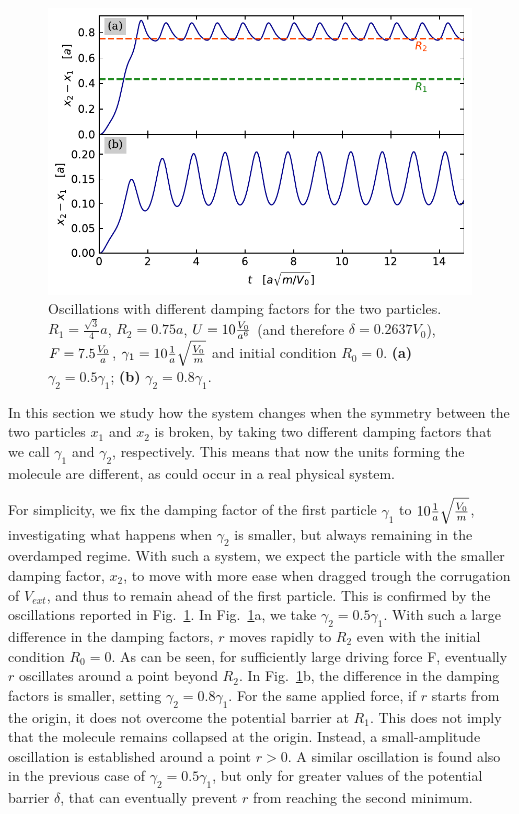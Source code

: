 \begin{figure}
\begin{center}
    \centering
    \includegraphics[width=1\linewidth]{Images/different.pdf}
    \caption{Oscillations with different damping factors for the two particles. $R_1 = \frac{\sqrt{3}}{4} a$, $R_2 = 0.75 a$, $ U = 10 \frac{V_0}{a^6}$ (and therefore $\delta = 0.2637 V_0$), $F = 7.5 \frac{V_0}{a}$, $\gamma_1 = 10 \frac{1}{a}\sqrt{\frac{V_0}{m}}$ and initial condition $R_0=0$. \textbf{(a)} $\gamma_2 = 0.5 \gamma_1$; \textbf{(b)} $\gamma_2 = 0.8 \gamma_1$.  }
    \label{Fig:different}
\end{center}
\end{figure}

In this section we study how the system changes when the symmetry between the two particles $x_1$ and $x_2$ is broken, by taking two different damping factors that we call $\gamma_1$ and $\gamma_2$, respectively. This means that now the units forming the molecule are different, as could occur in a real physical system. 

For simplicity, we fix the damping factor of the first particle $\gamma_1$ to $10\frac{1}{a}\sqrt{\frac{V_0}{m}}$, investigating what happens when $\gamma_2$ is smaller, but always remaining in the overdamped regime. With such a system, we expect the particle with the smaller damping factor, $x_2$, to move with more ease when dragged trough the corrugation of $V_{ext}$, and thus to remain ahead of the first particle. This is confirmed by the oscillations reported in Fig.~\ref{Fig:different}. In Fig.~\ref{Fig:different}a, we take $\gamma_2 = 0.5 \gamma_1$. With such a large difference in the damping factors, $r$ moves rapidly to $R_2$ even with the initial condition $R_0 = 0$. As can be seen, for sufficiently large driving force F, eventually $r$ oscillates around a point beyond $R_2$. In Fig.~\ref{Fig:different}b, the difference in the damping factors is smaller, setting $\gamma_2 = 0.8\gamma_1$. For the same applied force, if $r$ starts from the origin, it does not overcome the potential barrier at $R_1$. This does not imply that the molecule remains collapsed at the origin. Instead, a small-amplitude oscillation is established around a point $r>0$. A similar oscillation is found also in the previous case of $\gamma_2 = 0.5\gamma_1$, but only for greater values of the potential barrier $\delta$, that can eventually prevent $r$ from reaching the second minimum.

